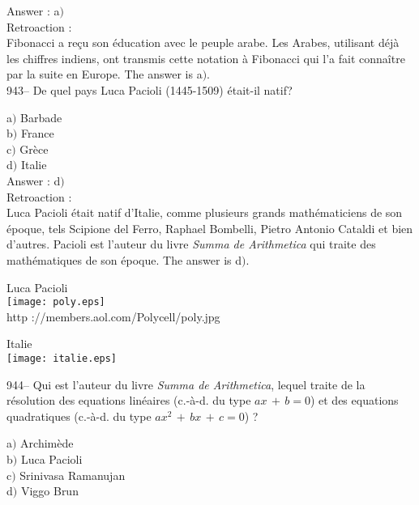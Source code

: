 ﻿\documentclass[letterpaper, 12pt]{article}
\begin{document}
Answer : a$)$\\

Retroaction : \\
Fibonacci a re\c cu son \'education avec le peuple arabe. Les
Arabes, utilisant d\'ej\`a les chiffres indiens, ont transmis
cette notation \`a Fibonacci qui l'a fait conna\^itre par la suite en
Europe. The answer is a$)$.\\

943-- De quel pays Luca Pacioli (1445-1509) \'etait-il natif?

a$)$ Barbade \\
b$)$ France  \\
c$)$ Gr\`ece \\
d$)$ Italie \\

Answer : d$)$\\

Retroaction :\\
Luca Pacioli \'etait natif d'Italie, comme plusieurs grands
math\'ematiciens de son \'epoque, tels Scipione del Ferro, Raphael
Bombelli, Pietro Antonio Cataldi et bien d'autres. Pacioli
est l'auteur du livre {\sl Summa de Arithmetica} qui traite des
math\'ematiques de son \'epoque. The answer is d$)$.\\

        \begin{center}
        Luca Pacioli\\
    \texttt{[image: poly.eps]}\\
        {\footnotesize http ://members.aol.com/Polycell/poly.jpg}
    \end{center}

        \begin{center}
        Italie\\
    \texttt{[image: italie.eps]}\\
    \end{center}

944-- Qui est l'auteur du livre {\sl Summa de Arithmetica}, lequel
traite de la r\'esolution des equations lin\'eaires (c.-\`a-d. du
type $ax\,+\,b=0$) et des equations quadratiques (c.-\`a-d. du
type $ax^2\,+\,bx\,+\,c=0$) ?

a$)$ Archim\`ede \\
b$)$ Luca Pacioli  \\
c$)$ Srinivasa Ramanujan \\
d$)$ Viggo Brun \\
\end{document}
